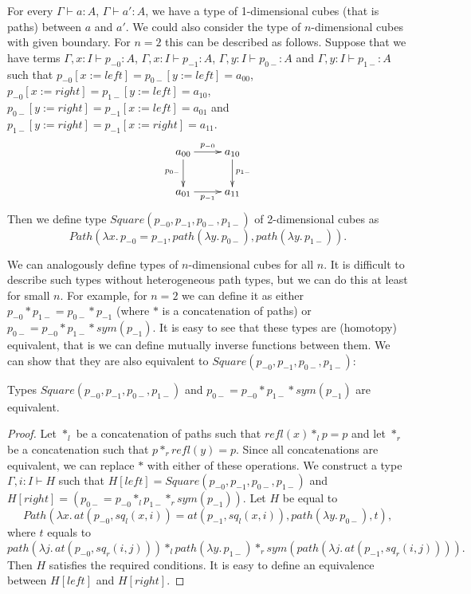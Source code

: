 \documentclass[reqno]{amsart}
\theoremstyle{definition}
\theoremstyle{remark}
\newcommand{\repl}{:=}
\numberwithin{figure}{section}
\begin{document}
For every $\Gamma \vdash a : A$, $\Gamma \vdash a' : A$, we have a type of 1-dimensional cubes (that is paths) between $a$ and $a'$.
We could also consider the type of $n$-dimensional cubes with given boundary.
For $n = 2$ this can be described as follows.
Suppose that we have terms $\Gamma, x : I \vdash p_{-0} : A$, $\Gamma, x : I \vdash p_{-1} : A$, $\Gamma, y : I \vdash p_{0-} : A$ and $\Gamma, y : I \vdash p_{1-} : A$
such that $p_{-0}[x \repl left] = p_{0-}[y \repl left] = a_{00}$, $p_{-0}[x \repl right] = p_{1-}[y \repl left] = a_{10}$,
$p_{0-}[y \repl right] = p_{-1}[x \repl left] = a_{01}$ and $p_{1-}[y \repl right] = p_{-1}[x \repl right] = a_{11}$.
\[ \xymatrix{ a_{00} \ar[r]^{p_{-0}} \ar[d]_{p_{0-}} & a_{10} \ar[d]^{p_{1-}} \\
              a_{01} \ar[r]_{p_{-1}}                 & a_{11}
            } \]
Then we define type $Square(p_{-0},p_{-1},p_{0-},p_{1-})$ of 2-dimensional cubes as
\[ Path(\lambda x.\,p_{-0} = p_{-1}, path(\lambda y.\,p_{0-}), path(\lambda y.\,p_{1-})). \]

We can analogously define types of $n$-dimensional cubes for all $n$.
It is difficult to describe such types without heterogeneous path types,
but we can do this at least for small $n$.
For example, for $n = 2$ we can define it as either $p_{-0} * p_{1-} = p_{0-} * p_{-1}$ (where $*$ is a concatenation of paths) or $p_{0-} = p_{-0} * p_{1-} * sym(p_{-1})$.
It is easy to see that these types are (homotopy) equivalent, that is we can define mutually inverse functions between them.
We can show that they are also equivalent to $Square(p_{-0},p_{-1},p_{0-},p_{1-})$:

\begin{lem}[squares-eq]
Types $Square(p_{-0},p_{-1},p_{0-},p_{1-})$ and $p_{0-} = p_{-0} * p_{1-} * sym(p_{-1})$ are equivalent.
\end{lem}
\begin{proof}
Let $*_l$ be a concatenation of paths such that $refl(x) *_l p = p$ and let $*_r$ be a concatenation such that $p *_r refl(y) = p$.
Since all concatenations are equivalent, we can replace $*$ with either of these operations.
We construct a type $\Gamma, i : I \vdash H$ such that $H[left] = Square(p_{-0},p_{-1},p_{0-},p_{1-})$ and $H[right] = (p_{0-} = p_{-0} *_l p_{1-} *_r sym(p_{-1}))$.
Let $H$ be equal to
\[ Path(\lambda x.\,at(p_{-0},sq_l(x,i)) = at(p_{-1},sq_l(x,i)), path(\lambda y.\,p_{0-}), t), \]
where $t$ equals to
\[ path(\lambda j.\,at(p_{-0},sq_r(i,j))) *_l path(\lambda y.\,p_{1-}) *_r sym(path(\lambda j.\,at(p_{-1},sq_r(i,j)))). \]
Then $H$ satisfies the required conditions.
It is easy to define an equivalence between $H[left]$ and $H[right]$.
\end{proof}
\end{document}
